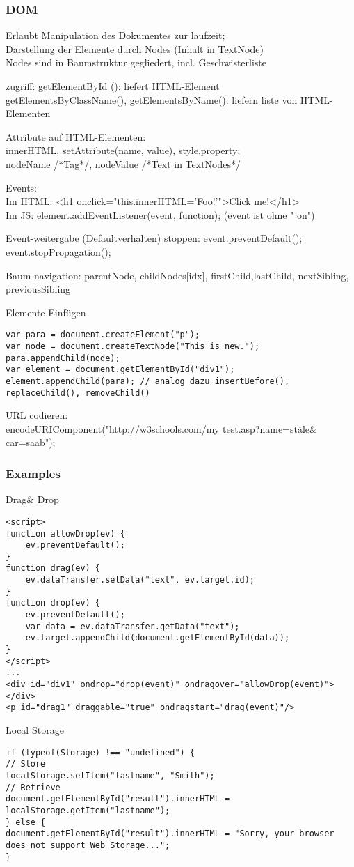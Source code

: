\subsubsection*{DOM}
Erlaubt Manipulation des Dokumentes zur laufzeit;\\
Darstellung der Elemente durch Nodes (Inhalt in TextNode)\\
Nodes sind in Baumstruktur gegliedert, incl. Geschwisterliste

zugriff:
getElementById (): liefert HTML-Element\\
getElementsByClassName(), getElementsByName(): liefern liste von HTML-Elementen

Attribute auf HTML-Elementen:\\
innerHTML, setAttribute(name, value), style.property;\\
nodeName /*Tag*/, nodeValue /*Text in TextNodes*/

Events: \\
Im HTML: <h1 onclick="this.innerHTML='Foo!'">Click me!</h1>\\
Im JS: element.addEventListener(event, function);    (event ist ohne " on")

Event-weitergabe (Defaultverhalten) stoppen:  
event.preventDefault(); event.stopPropagation();

Baum-navigation: parentNode, childNodes[idx], firstChild,lastChild,
nextSibling, previousSibling

Elemente Einfügen
\begin{verbatim}
var para = document.createElement("p");
var node = document.createTextNode("This is new.");
para.appendChild(node);
var element = document.getElementById("div1");
element.appendChild(para); // analog dazu insertBefore(), replaceChild(), removeChild()
\end{verbatim}

URL codieren:\\
encodeURIComponent("http://w3schools.com/my test.asp?name=stäle\& car=saab");

\subsubsection*{Examples}
Drag\& Drop
\begin{verbatim}
<script>
function allowDrop(ev) {
	ev.preventDefault();
}
function drag(ev) {
	ev.dataTransfer.setData("text", ev.target.id);
}
function drop(ev) {
	ev.preventDefault();
	var data = ev.dataTransfer.getData("text");
	ev.target.appendChild(document.getElementById(data));
}
</script>
...
<div id="div1" ondrop="drop(event)" ondragover="allowDrop(event)"></div>
<p id="drag1" draggable="true" ondragstart="drag(event)"/>
\end{verbatim}
Local Storage
\begin{verbatim}
if (typeof(Storage) !== "undefined") {
// Store
localStorage.setItem("lastname", "Smith");
// Retrieve
document.getElementById("result").innerHTML = localStorage.getItem("lastname");
} else {
document.getElementById("result").innerHTML = "Sorry, your browser does not support Web Storage...";
}
\end{verbatim}